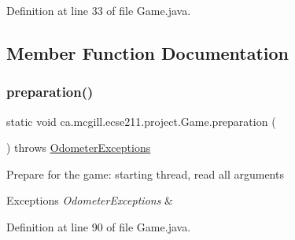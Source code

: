 Definition at line 33 of file Game.\+java.



\subsection{Member Function Documentation}
\mbox{\label{classca_1_1mcgill_1_1ecse211_1_1project_1_1_game_a1bcbd1c19309c65a6887ae19bde66765}} 
\subsubsection{\texorpdfstring{preparation()}{preparation()}}
{\footnotesize\ttfamily static void ca.\+mcgill.\+ecse211.\+project.\+Game.\+preparation (\begin{DoxyParamCaption}{ }\end{DoxyParamCaption}) throws \hyperlink{classca_1_1mcgill_1_1ecse211_1_1odometer_1_1_odometer_exceptions}{Odometer\+Exceptions}\hspace{0.3cm}{\ttfamily [static]}}

Prepare for the game\+: starting thread, read all arguments


\begin{DoxyExceptions}{Exceptions}
{\em Odometer\+Exceptions} & \\
\hline
\end{DoxyExceptions}


Definition at line 90 of file Game.\+java.

